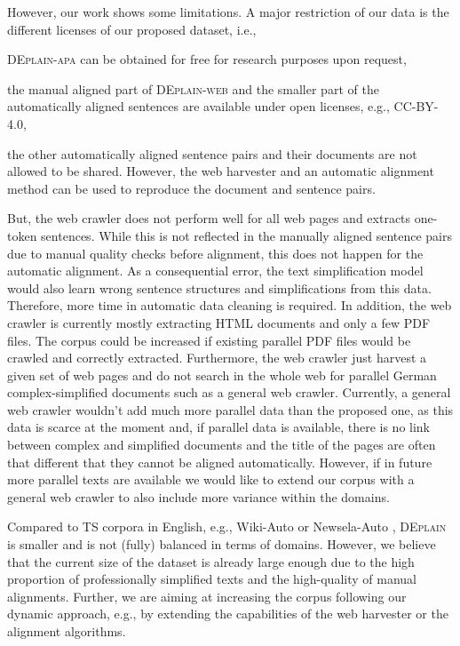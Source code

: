 \documentclass[11pt]{article}
\begin{document}
However, our work shows some limitations. A major restriction of our data is the different licenses of our proposed dataset, i.e., 
\begin{enumerate*}[label=\roman*)]
\item \textsc{DEplain-apa} can be obtained for free for research purposes upon request,
\item the manual aligned part of \textsc{DEplain-web} and the smaller part of the  automatically aligned sentences are available under open licenses, e.g., CC-BY-4.0,
\item the other automatically aligned sentence pairs and their documents are not allowed to be shared. However, the web harvester and an automatic alignment method can be used to reproduce the document and sentence pairs. 
\end{enumerate*}\par

But, the web crawler does not perform well for all web pages and extracts one-token sentences. While this is not reflected in the manually aligned sentence pairs due to manual quality checks before alignment, this does not happen for the automatic alignment. As a consequential error, the text simplification model would also learn wrong sentence structures and simplifications from this data. Therefore, more time in automatic data cleaning is required. In addition, the web crawler is currently mostly extracting HTML documents and only a few PDF files. The corpus could be increased if existing parallel PDF files would be crawled and correctly extracted. Furthermore, the web crawler just harvest a given set of web pages and do not search in the whole web for parallel German complex-simplified documents such as a general web crawler. Currently, a general web crawler wouldn't add much more parallel data than the proposed one, as this data is scarce at the moment and, if parallel data is available, there is no link between complex and simplified documents and the title of the pages are often that different that they cannot be aligned automatically. However, if in future more parallel texts are available we would like to extend our corpus with a general web crawler to also include more variance within the domains.\par 

Compared to TS corpora in English, e.g., Wiki-Auto or Newsela-Auto \cite{jiang-etal-2020-neural}, \textsc{DEplain} is smaller and is not (fully) balanced in terms of domains. However, we believe that the current size of the dataset is already large enough due to the high proportion of professionally simplified texts and the high-quality of manual alignments. 
Further, we are aiming at increasing the corpus following our dynamic approach, e.g., by extending the capabilities of the web harvester or the alignment algorithms.
\end{document}
